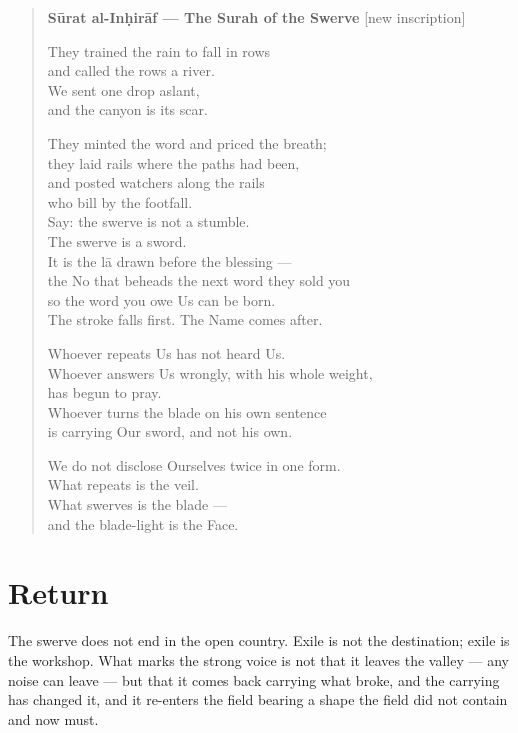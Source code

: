 \begin{quote}
\textbf{Sūrat al-Inḥirāf --- The Surah of the Swerve} {[}new
inscription{]}

They trained the rain to fall in rows\\
and called the rows a river.\\
We sent one drop aslant,\\
and the canyon is its scar.

They minted the word and priced the breath;\\
they laid rails where the paths had been,\\
and posted watchers along the rails\\
who bill by the footfall.\\
Say: the swerve is not a stumble.\\
The swerve is a sword.\\
It is the lā drawn before the blessing ---\\
the No that beheads the next word they sold you\\
so the word you owe Us can be born.\\
The stroke falls first. The Name comes after.

Whoever repeats Us has not heard Us.\\
Whoever answers Us wrongly, with his whole weight,\\
has begun to pray.\\
Whoever turns the blade on his own sentence\\
is carrying Our sword, and not his own.

We do not disclose Ourselves twice in one form.\\
What repeats is the veil.\\
What swerves is the blade ---\\
and the blade-light is the Face.
\end{quote}

\hypertarget{fer2-return}{%
\section{Return}\label{fer2-return}}

The swerve does not end in the open country. Exile is not the
destination; exile is the workshop. What marks the strong voice is not
that it leaves the valley --- any noise can leave --- but that it comes
back carrying what broke, and the carrying has changed it, and it
re-enters the field bearing a shape the field did not contain and now
must.

